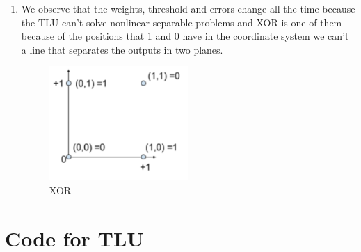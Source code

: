 \documentclass{article}
\begin{document}
\begin{enumerate}[{6}]
  \item We observe that the weights, threshold and errors change all the time because the TLU can’t solve nonlinear separable problems and XOR is one of them because of the positions that 1 and 0 have in the coordinate system we can’t a line that separates the outputs in two planes.
  \begin{figure}[!h]
    \centering
    \includegraphics[width=0.5\textwidth]{img/xor.png}
    \caption{XOR}
    \label{fig:diagram}
  \end{figure}
\end{enumerate}
\section{Code for TLU}

\end{document}
